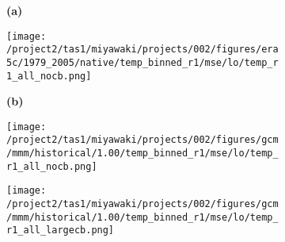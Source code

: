 \documentclass[preview]{standalone}
\begin{document}
\begin{figure}
  \begin{subfigure}[t]{0.05\textwidth}
    \textbf{\large{(a)}}
  \end{subfigure}
  \begin{subfigure}[t]{0.45\textwidth}
    \texttt{[image: /project2/tas1/miyawaki/projects/002/figures/era5c/1979\_2005/native/temp\_binned\_r1/mse/lo/temp\_r1\_all\_nocb.png]}
  \end{subfigure}
  \begin{subfigure}[t]{0.05\textwidth}
    \textbf{\large{(b)}}
  \end{subfigure}
  \begin{subfigure}[t]{0.45\textwidth}
    \texttt{[image: /project2/tas1/miyawaki/projects/002/figures/gcm/mmm/historical/1.00/temp\_binned\_r1/mse/lo/temp\_r1\_all\_nocb.png]}
  \end{subfigure}
  
  \begin{subfigure}[t]{\textwidth}
    \texttt{[image: /project2/tas1/miyawaki/projects/002/figures/gcm/mmm/historical/1.00/temp\_binned\_r1/mse/lo/temp\_r1\_all\_largecb.png]}
  \end{subfigure}
  
\end{figure}
\end{document}
